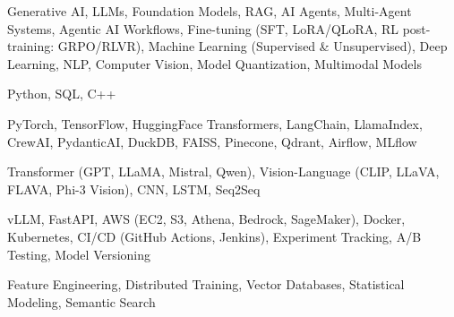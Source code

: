 \documentclass[letter,10pt]{article}
\begin{document}
 Generative AI, LLMs, Foundation Models, RAG, AI Agents, Multi-Agent Systems, Agentic AI Workflows, Fine-tuning (SFT, LoRA/QLoRA, RL post-training: GRPO/RLVR), Machine Learning (Supervised \& Unsupervised), Deep Learning, NLP, Computer Vision, Model Quantization, Multimodal Models\par\vspace{2pt}

 Python, SQL, C++\par\vspace{2pt}

 PyTorch, TensorFlow, HuggingFace Transformers, LangChain, LlamaIndex, CrewAI, PydanticAI, DuckDB, FAISS, Pinecone, Qdrant, Airflow, MLflow\par\vspace{2pt}

 Transformer (GPT, LLaMA, Mistral, Qwen), Vision-Language (CLIP, LLaVA, FLAVA, Phi-3 Vision), CNN, LSTM, Seq2Seq\par\vspace{2pt}

 vLLM, FastAPI, AWS (EC2, S3, Athena, Bedrock, SageMaker), Docker, Kubernetes, CI/CD (GitHub Actions, Jenkins), Experiment Tracking, A/B Testing, Model Versioning\par\vspace{2pt}

 Feature Engineering, Distributed Training, Vector Databases, Statistical Modeling, Semantic Search
\end{document}
